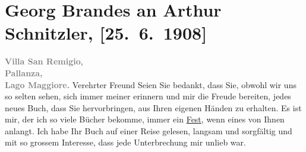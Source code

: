 

         \newcommand{\erwaehnteOrte}{Orte: Pallanza, Seis am Schlern, Villa San Remigio, Wien, Österreich}
         \newcommand{\erwaehnteWerke}{Werke: Der Weg ins Freie. Roman}
               \section[Georg Brandes an Arthur Schnitzler, {[}25. 6. 1908{]}]{ Georg Brandes an Arthur Schnitzler, {[}25. 6. 1908{]}}\nopagebreak{}\rehead{ }\begin{ledgroupsized}[t]{13cm}\normalsize\beginnumbering \toendnotes[C]{\smallbreak\pagebreak[2]} 
\toendnotes[C]{\smallbreak}\pstart
           \noindent{}{\pb}\textcolor{gray}{\textbf{Villa San Remigio}}, {\\}\textcolor{gray}{\textbf{Pallanza,}}{\\}\textcolor{gray}{\textbf{Lago Maggiore.}}\pend
           \pstart{}Verehrter Freund\pend\pstart
           Seien Sie bedankt, dass Sie, obwohl wir uns so selten sehen, sich immer meiner
                    erinnern und mir die Freude bereiten, jedes neues Buch, dass Sie hervorbringen,
                    aus Ihren eigenen Händen zu erhalten. Es ist mir, der ich so viele Bücher
                    bekomme, immer ein \uline{Fest}, wenn eines von Ihnen
                    anlangt.\pend
           \pstart
           Ich habe Ihr Buch auf einer
                    Reise gelesen, langsam und sorgfältig und mit so grossem Interesse, dass jede
                    Unterbrechung mir unlieb war.\pend

\end{ledgroupsized}
